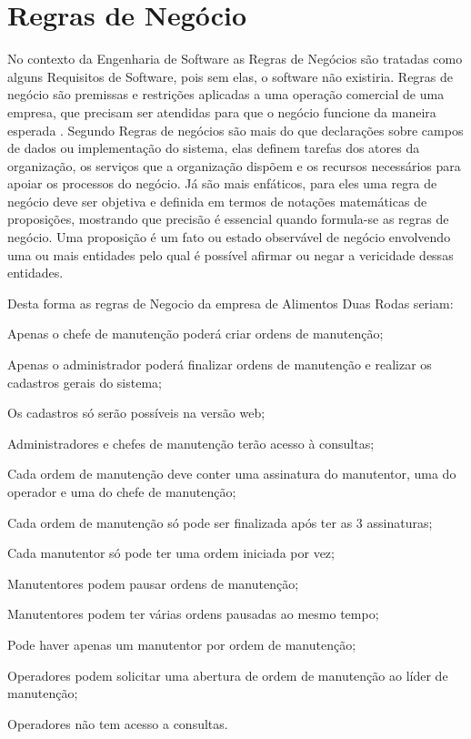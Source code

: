 \section{Regras de Negócio}
No contexto da Engenharia de Software as Regras de Negócios são tratadas como alguns Requisitos de Software, pois sem elas, o software não existiria. Regras de negócio são premissas e restrições aplicadas a uma operação comercial de uma empresa, que precisam ser atendidas para que o negócio funcione da maneira esperada \cite{crerie2008identificacao}.
Segundo \cite{2001SilviaInes} Regras de negócios são mais do que declarações sobre campos de dados ou implementação do sistema, elas definem tarefas dos atores da organização, os serviços que a organização dispõem e os recursos necessários para apoiar os processos do negócio.
Já \cite{1997kilovSimmonds} são mais enfáticos, para eles uma regra de negócio deve ser objetiva e definida em termos de notações matemáticas de proposições, mostrando que precisão é essencial quando formula-se as regras de negócio. Uma proposição é um fato ou estado observável de negócio envolvendo uma ou mais entidades pelo qual é possível afirmar ou negar a vericidade dessas entidades.

Desta forma as regras de Negocio da empresa de Alimentos Duas Rodas seriam:

\begin{subalineas}
	\item {Apenas o chefe de manutenção poderá criar ordens de manutenção};
	\item {Apenas o administrador poderá finalizar ordens de manutenção e realizar os cadastros gerais do sistema};
	\item {Os cadastros só serão possíveis na versão web};
	\item {Administradores e chefes de manutenção terão acesso à consultas};
	\item {Cada ordem de manutenção deve conter uma assinatura do manutentor, uma do operador e uma do chefe de manutenção};
	\item {Cada ordem de manutenção só pode ser finalizada após ter as 3 assinaturas};
	\item {Cada manutentor só pode ter uma ordem iniciada por vez};
	\item {Manutentores podem pausar ordens de manutenção};
	\item {Manutentores podem ter várias ordens pausadas ao mesmo tempo};
	\item {Pode haver apenas um manutentor por ordem de manutenção};
	\item {Operadores podem solicitar uma abertura de ordem de manutenção ao líder de manutenção};
	\item {Operadores não  tem acesso a consultas}.
\end{subalineas}

